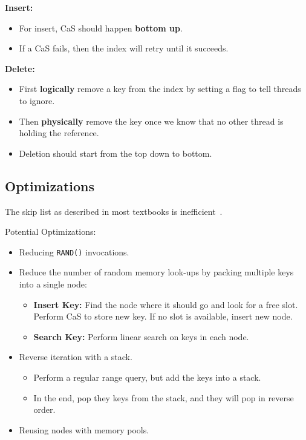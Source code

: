 \documentclass[11pt]{article}
\begin{document}
\textbf{Insert:}
\begin{itemize}
    \item
    For insert, CaS should happen \textbf{bottom up}.
    
    \item
    If a CaS fails, then the index will retry until it succeeds.
\end{itemize}

\textbf{Delete:}
\begin{itemize}
    \item
    First \textbf{logically} remove a key from the index by setting a flag to tell threads to 
    ignore.
    
    \item
    Then \textbf{physically} remove the key once we know that no other thread is holding the 
    reference.
    
    \item Deletion should start from the top down to bottom.
\end{itemize}

\subsection*{Optimizations}
The skip list as described in most textbooks is inefficient~\cite{skiplists-done-right2016}.

Potential Optimizations:
\begin{itemize}
    \item
    Reducing \texttt{RAND()} invocations.
    
    \item
    Reduce the number of random memory look-ups by packing multiple keys into a single node:
    \begin{itemize}
        \item \textbf{Insert Key:}
        Find the node where it should go and look for a free slot. 
        Perform CaS to store new key. If no slot is available, insert new node.
        
        \item \textbf{Search Key:}
        Perform linear search on keys in each node.
    \end{itemize}
    
    \item
    Reverse iteration with a stack.
    \begin{itemize}
        \item
        Perform a regular range query, but add the keys into a stack.
        
        \item
        In the end, pop they keys from the stack, and they will pop in reverse order.
    \end{itemize}
    
    \item
    Reusing nodes with memory pools.
\end{itemize}
\end{document}
